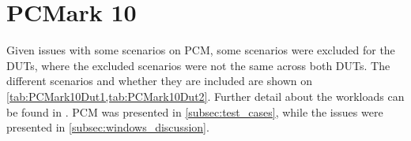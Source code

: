 \section{PCMark 10}

Given issues with some scenarios on PCM, some scenarios were excluded for the DUTs, where the excluded scenarios were not the same across both DUTs. The different scenarios and whether they are included are shown on \cref{tab:PCMark10Dut1,tab:PCMark10Dut2}. Further detail about the workloads can be found in \cite{pcmark}. PCM was presented in \cref{subsec:test_cases}, while the issues were presented in \cref{subsec:windows_discussion}.


